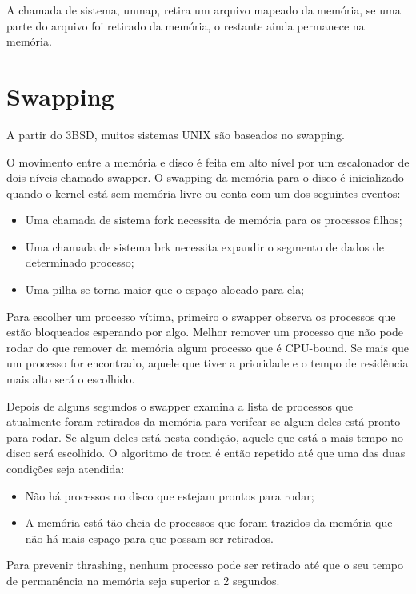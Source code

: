 A chamada de sistema, unmap, retira um arquivo mapeado da memória, se uma parte do arquivo foi retirado da memória, o restante ainda permanece na memória.

\section{Swapping}

A partir do 3BSD, muitos sistemas UNIX são baseados no swapping.

O movimento entre a memória e disco é feita em alto nível por um escalonador de dois níveis chamado swapper. O swapping da memória para o disco é inicializado quando o kernel está sem memória livre ou conta com um dos seguintes eventos:

\begin{itemize}
\item Uma chamada de sistema fork necessita de memória para os processos filhos;
\item Uma chamada de sistema brk necessita expandir o segmento de dados de determinado processo;
\item Uma pilha se torna maior que o espaço alocado para ela;
\end{itemize}

Para escolher um processo vítima, primeiro o swapper observa os processos que estão bloqueados esperando por algo. Melhor remover um processo que não pode rodar do que remover da memória algum processo que é CPU-bound. Se mais que um processo for encontrado, aquele que tiver a prioridade e o tempo de residência mais alto será o escolhido.

Depois de alguns segundos o swapper examina a lista de processos que atualmente foram retirados da memória para verifcar se algum deles está pronto para rodar. Se algum deles está nesta condição, aquele que está a mais tempo no disco será escolhido. O algoritmo de troca é então repetido até que uma das duas condições seja atendida:

\begin{itemize}
\item Não há processos no disco que estejam prontos para rodar;
\item A memória está tão cheia de processos que foram trazidos da memória que não há mais espaço para que possam ser retirados.
\end{itemize}

Para prevenir thrashing, nenhum processo pode ser retirado até que o seu tempo de permanência na memória seja superior a 2 segundos.

